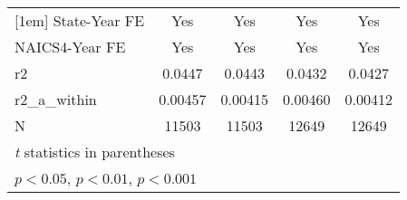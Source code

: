 {\begin{tabular}{l*{4}{c}}
[1em]
State-Year FE&         Yes         &         Yes         &         Yes         &         Yes         \\
[1em]
NAICS4-Year FE&         Yes         &         Yes         &         Yes         &         Yes         \\
\hline
r2          &      0.0447         &      0.0443         &      0.0432         &      0.0427         \\
r2\_a\_within &     0.00457         &     0.00415         &     0.00460         &     0.00412         \\
N           &       11503         &       11503         &       12649         &       12649         \\
\hline\hline
\multicolumn{5}{l}{\footnotesize \textit{t} statistics in parentheses}\\
\multicolumn{5}{l}{\footnotesize \sym{*} \(p<0.05\), \sym{**} \(p<0.01\), \sym{***} \(p<0.001\)}\\
\end{tabular}
}
